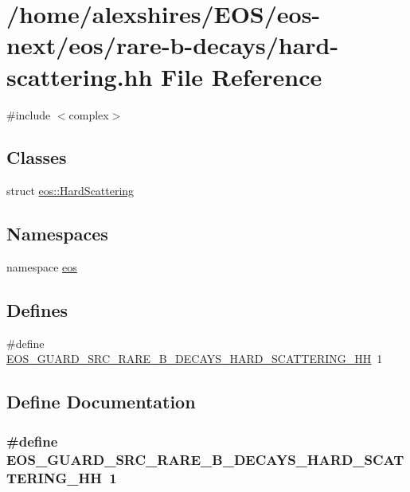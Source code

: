 \hypertarget{hard-scattering_8hh}{
\section{/home/alexshires/EOS/eos-\/next/eos/rare-\/b-\/decays/hard-\/scattering.hh File Reference}
\label{hard-scattering_8hh}
}
{\ttfamily \#include $<$complex$>$}\par
\subsection*{Classes}
\begin{DoxyCompactItemize}
\item 
struct \hyperlink{structeos_1_1HardScattering}{eos::HardScattering}
\end{DoxyCompactItemize}
\subsection*{Namespaces}
\begin{DoxyCompactItemize}
\item 
namespace \hyperlink{namespaceeos}{eos}
\end{DoxyCompactItemize}
\subsection*{Defines}
\begin{DoxyCompactItemize}
\item 
\#define \hyperlink{hard-scattering_8hh_af586398d56cad6df3a9918a7a249495b}{EOS\_\-GUARD\_\-SRC\_\-RARE\_\-B\_\-DECAYS\_\-HARD\_\-SCATTERING\_\-HH}~1
\end{DoxyCompactItemize}


\subsection{Define Documentation}
\hypertarget{hard-scattering_8hh_af586398d56cad6df3a9918a7a249495b}{
\subsubsection[{EOS\_\-GUARD\_\-SRC\_\-RARE\_\-B\_\-DECAYS\_\-HARD\_\-SCATTERING\_\-HH}]{\setlength{\rightskip}{0pt plus 5cm}\#define EOS\_\-GUARD\_\-SRC\_\-RARE\_\-B\_\-DECAYS\_\-HARD\_\-SCATTERING\_\-HH~1}}
\label{hard-scattering_8hh_af586398d56cad6df3a9918a7a249495b}
